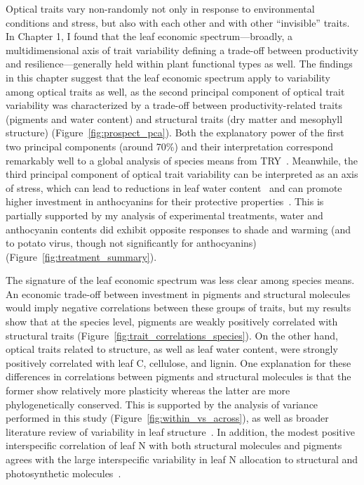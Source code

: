 Optical traits vary non-randomly not only in response to environmental conditions and stress, but also with each other and with other ``invisible'' traits.
In Chapter 1, I found that the leaf economic spectrum---broadly, a multidimensional axis of trait variability defining a trade-off between productivity and resilience---generally held within plant functional types as well.
The findings in this chapter suggest that the leaf economic spectrum apply to variability among optical traits as well, as the second principal component of optical trait variability was characterized by a trade-off between productivity-related traits (pigments and water content) and structural traits (dry matter and mesophyll structure) (Figure~\ref{fig:prospect_pca}).
Both the explanatory power of the first two principal components (around 70\%) and their interpretation correspond remarkably well to a global analysis of species means from TRY~\cite{diaz_global_2016}.
Meanwhile, the third principal component of optical trait variability can be interpreted as an axis of stress, which can lead to reductions in leaf water content~\cite{penuelas_1994_reflectance,kramer_1995_water,cheng_2011_spectroscopic} and can promote higher investment in anthocyanins for their protective properties~\cite{gould_2004_nature}.
This is partially supported by my analysis of experimental treatments, water and anthocyanin contents did exhibit opposite responses to shade and warming (and to potato virus, though not significantly for anthocyanins) (Figure~\ref{fig:treatment_summary}).

The signature of the leaf economic spectrum was less clear among species means.
An economic trade-off between investment in pigments and structural molecules would imply negative correlations between these groups of traits,
but my results show that at the species level, pigments are weakly positively correlated with structural traits (Figure~\ref{fig:trait_correlations_species}).
On the other hand, optical traits related to structure, as well as leaf water content, were strongly positively correlated with leaf C, cellulose, and lignin.
One explanation for these differences in correlations between pigments and structural molecules is that the former show relatively more plasticity whereas the latter are more phylogenetically conserved.
This is supported by the analysis of variance performed in this study (Figure~\ref{fig:within_vs_across}), as well as broader literature review of variability in leaf structure~\cite{poorter_2009_causes,onoda_physiological_2017}.
In addition, the modest positive interspecific correlation of leaf N with both structural molecules and pigments agrees with the large interspecific variability in leaf N allocation to structural and photosynthetic molecules~\cite{onoda_physiological_2017}.


